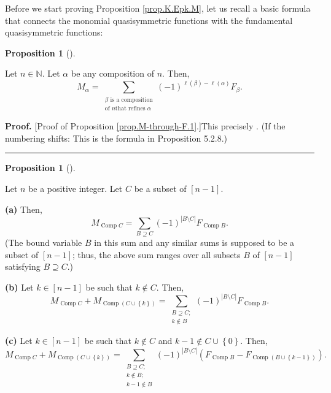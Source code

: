 \documentclass[numbers=enddot,12pt,final,onecolumn,notitlepage]{scrartcl}%
\theoremstyle{definition}
\newtheorem{prop}[theo]{Proposition}
\newenvironment{proposition}[1][]
{\begin{prop}[#1]\begin{leftbar}}
{\end{leftbar}\end{prop}}
\newenvironment{proof}[1][Proof]{\noindent\textbf{#1.} }{\ \rule{0.5em}{0.5em}}
\let\sumnonlimits\sum
\renewcommand{\sum}{\sumnonlimits\limits}
\begin{document}
Before we start proving Proposition \ref{prop.K.Epk.M}, let us recall a basic
formula that connects the monomial quasisymmetric functions with the
fundamental quasisymmetric functions:

\begin{proposition}
\label{prop.M-through-F.1}Let $n\in\mathbb{N}$. Let $\alpha$ be any
composition of $n$. Then,%
\[
M_{\alpha}=\sum_{\substack{\beta\text{ is a composition}\\\text{of }n\text{
that refines }\alpha}}\left(  -1\right)  ^{\ell\left(  \beta\right)
-\ell\left(  \alpha\right)  }F_{\beta}.
\]

\end{proposition}

\begin{proof}
[Proof of Proposition \ref{prop.M-through-F.1}.]This precisely \cite[(5.2.2)]%
{HopfComb}. (If the numbering shifts: This is the formula in Proposition 5.2.8.)
\end{proof}

\begin{proposition}
\label{prop.M-through-F.2}Let $n$ be a positive integer. Let $C$ be a subset
of $\left[  n-1\right]  $.

\textbf{(a)} Then,%
\[
M_{\operatorname*{Comp}C}=\sum_{B\supseteq C}\left(  -1\right)  ^{\left\vert
B\setminus C\right\vert }F_{\operatorname*{Comp}B}.
\]
(The bound variable $B$ in this sum and any similar sums is supposed to be a
subset of $\left[  n-1\right]  $; thus, the above sum ranges over all subsets
$B$ of $\left[  n-1\right]  $ satisfying $B\supseteq C$.)

\textbf{(b)} Let $k\in\left[  n-1\right]  $ be such that $k\notin C$. Then,%
\[
M_{\operatorname*{Comp}C}+M_{\operatorname*{Comp}\left(  C\cup\left\{
k\right\}  \right)  }=\sum_{\substack{B\supseteq C;\\k\notin B}}\left(
-1\right)  ^{\left\vert B\setminus C\right\vert }F_{\operatorname*{Comp}B}.
\]


\textbf{(c)} Let $k\in\left[  n-1\right]  $ be such that $k\notin C$ and
$k-1\notin C\cup\left\{  0\right\}  $. Then,%
\[
M_{\operatorname*{Comp}C}+M_{\operatorname*{Comp}\left(  C\cup\left\{
k\right\}  \right)  }=\sum_{\substack{B\supseteq C;\\k\notin B;\\k-1\notin
B}}\left(  -1\right)  ^{\left\vert B\setminus C\right\vert }\left(
F_{\operatorname*{Comp}B}-F_{\operatorname*{Comp}\left(  B\cup\left\{
k-1\right\}  \right)  }\right)  .
\]

\end{proposition}
\end{document}
